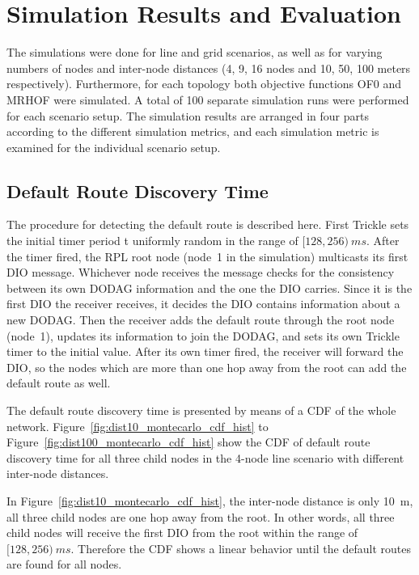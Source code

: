 \chapter{Simulation Results and Evaluation}
\label{ResultandEvaluation}

The simulations were done for line and grid scenarios, as well as for varying numbers of nodes and inter-node distances (4, 9, 16 nodes and 10, 50, 100 meters respectively). Furthermore, for each topology both objective functions OF0 and MRHOF were simulated. A total of 100 separate simulation runs were performed for each scenario setup. The simulation results are arranged in four parts according to the different simulation metrics, and each simulation metric is examined for the individual scenario setup.

\section{Default Route Discovery Time}
\label{default route}

The procedure for detecting the default route is described here. First Trickle sets the initial timer period t uniformly random in the range of $[128, 256)\:ms$\@. After the timer fired, the RPL root node (node~1 in the simulation) multicasts its first DIO message. Whichever node receives the message checks for the consistency between its own DODAG information and the one the DIO carries. Since it is the first DIO the receiver receives, it decides the DIO contains information about a new DODAG. Then the receiver adds the default route through the root node (node~1), updates its information to join the DODAG, and sets its own Trickle timer to the initial value. After its own timer fired, the receiver will forward the DIO, so the nodes which are more than one hop away from the root can add the default route as well.

The default route discovery time is presented by means of a CDF of the whole network. Figure~\ref{fig:dist10_montecarlo_cdf_hist} to Figure~\ref{fig:dist100_montecarlo_cdf_hist} show the CDF of default route discovery time for all three child nodes in the 4-node line scenario with different inter-node distances.

In Figure~\ref{fig:dist10_montecarlo_cdf_hist}, the inter-node distance is only 10~m, all three child nodes are one hop away from the root. In other words, all three child nodes will receive the first DIO from the root within the range of $[128, 256)\:ms$. Therefore the CDF shows a linear behavior until the default routes are found for all nodes.

